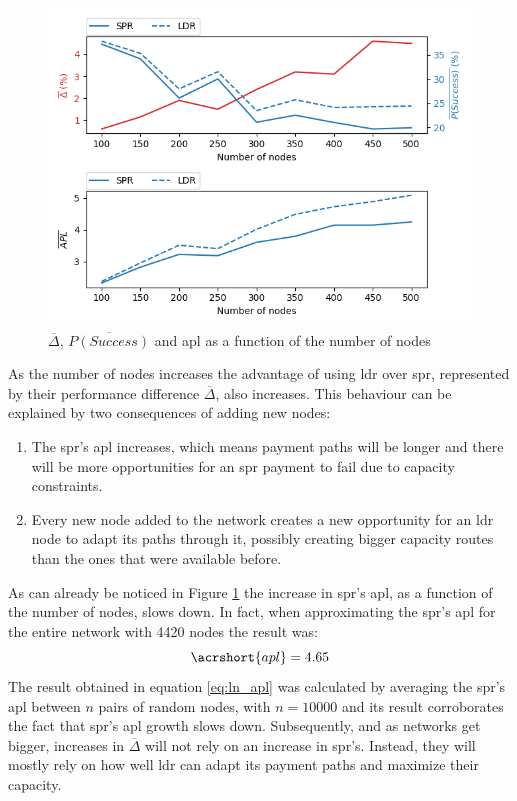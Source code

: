 \begin{figure}[H]
\begin{center}
  \includegraphics[width=\linewidth]{images/simulation_results5.png}
  \caption{$\overline{\Delta}$, $\overline{P(Success)}$ and \acrshort{apl} as a function of the number of nodes}
  \label{fig:simulation_results5}
  \end{center}
\end{figure}

As the number of nodes increases the advantage of using \acrshort{ldr} over \acrshort{spr}, represented by their performance difference $\overline{\Delta}$, also increases. This behaviour can be explained by two consequences of adding new nodes:
\begin{enumerate}
	\item The \acrshort{spr}'s \acrshort{apl} increases, which means payment paths will be longer and there will be more opportunities for an \acrshort{spr} payment to fail due to capacity constraints.
	\item Every new node added to the network creates a new opportunity for an \acrshort{ldr} node to adapt its paths through it, possibly creating bigger capacity routes than the ones that were available before.
\end{enumerate}

As can already be noticed in Figure \ref{fig:simulation_results5} the increase in \acrshort{spr}'s \acrshort{apl}, as a function of the number of nodes, slows down. In fact, when approximating the \acrshort{spr}'s \acrshort{apl} for the entire network with 4420 nodes the result was:
 \begin{equation}
     \acrshort{apl} = 4.65
\label{eq:ln_apl}
 \end{equation}
 The result obtained in equation \ref{eq:ln_apl} was calculated by averaging the \acrshort{spr}'s \acrshort{apl} between $n$ pairs of random nodes, with $n=10000$ and its result corroborates the fact that \acrshort{spr}'s \acrshort{apl} growth slows down. Subsequently, and as networks get bigger, increases in $\overline{\Delta}$ will not rely on an increase in \acrshort{spr}'s. Instead, they will mostly rely on how well \acrshort{ldr} can adapt its payment paths and maximize their capacity.\\ 
